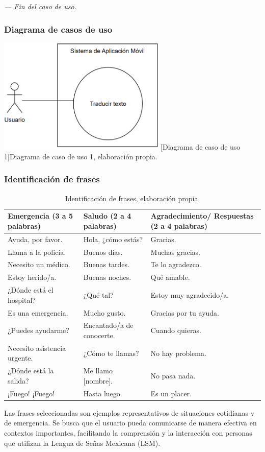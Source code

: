 \textit{--- Fin del caso de uso.}


\subsubsection{Diagrama de casos de uso}
\begin{center}
    \includegraphics[width=0.6\textwidth]{Images/Cap 3/casodeuso.png}
    [Diagrama de caso de uso 1]{Diagrama de caso de uso 1, elaboración propia.}
\end{center}


\subsubsection{Identificación de frases}

\begin{table}[H]
\centering
\begin{tabularx}{\textwidth}{|X|X|X|}
\hline
\textbf{Emergencia (3 a 5 palabras)} & \textbf{Saludo (2 a 4 palabras)} & \textbf{Agradecimiento/ Respuestas (2 a 4 palabras)} \\ \hline
Ayuda, por favor. & Hola, ¿cómo estás? & Gracias. \\ \hline
Llama a la policía. & Buenos días. & Muchas gracias. \\ \hline
Necesito un médico. & Buenas tardes. & Te lo agradezco. \\ \hline
Estoy herido/a. & Buenas noches. & Qué amable. \\ \hline
¿Dónde está el hospital? & ¿Qué tal? & Estoy muy agradecido/a. \\ \hline
Es una emergencia. & Mucho gusto. & Gracias por tu ayuda. \\ \hline
¿Puedes ayudarme? & Encantado/a de conocerte. & Cuando quieras. \\ \hline
Necesito asistencia urgente. & ¿Cómo te llamas? & No hay problema. \\ \hline
¿Dónde está la salida? & Me llamo [nombre]. & No pasa nada. \\ \hline
¡Fuego! ¡Fuego! & Hasta luego. & Es un placer. \\ \hline
\end{tabularx}
\caption[Identificación de frases]{Identificación de frases, elaboración propia.}
\end{table}
Las frases seleccionadas son ejemplos representativos de situaciones cotidianas y de emergencia. Se busca que el usuario pueda comunicarse de manera efectiva en contextos importantes, facilitando la comprensión y la interacción con personas que utilizan la Lengua de Señas Mexicana (LSM).

